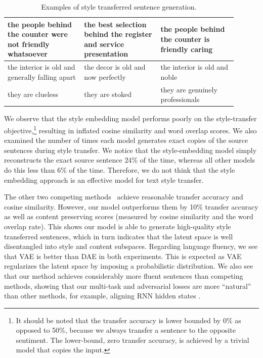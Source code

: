 \documentclass[letterpaper]{article} %
\begin{document}
\begin{table}[!t]
{\begin{tabular}{| p{0.3\linewidth} || p{0.3\linewidth} | p{0.3\linewidth} |}
			the people behind the counter were not friendly whatsoever              & the best selection behind the register and service presentation           & the people behind the counter is friendly caring           \\ \hline
			the interior is old and generally falling apart                         & the decor is old and now perfectly                                        & the interior is old and noble                              \\ \hline
			they are clueless                                                       & they are stoked                                                           & they are genuinely professionals                           \\ \hline
		\end{tabular}}\vspace{-.2cm}
	\caption{Examples of style transferred sentence generation.}\vspace{-.2cm}
	\label{tab:transfer-samples}
\end{table}

We observe that the style embedding model \cite{fu2018style} performs poorly on the style-transfer objective,\footnote{It should be noted that the transfer accuracy is lower bounded by 0\% as opposed to 50\%, because we always transfer a sentence to the opposite sentiment. The lower-bound, zero transfer accuracy, is achieved by a trivial model that copies the input.} resulting in inflated cosine similarity and word overlap scores. We also examined the number of times each model generates exact copies of the source sentences during style transfer. We notice that the style-embedding model simply reconstructs the exact source sentence $24\%$ of the time, whereas all other models do this less than $6\%$ of the time. Therefore, we do not think that the style embedding approach is an effective model for text style transfer.

The other two competing methods~\cite{shen2017style,zhao2018adversarially} achieve reasonable transfer accuracy and cosine similarity. However, our model outperforms them by 10\% transfer accuracy as well as content preserving scores (measured by cosine similarity and the word overlap rate). This shows our model is able to generate high-quality style transferred sentences, which in turn indicates that the  latent space  is well disentangled into style and content subspaces. Regarding language fluency, we see that VAE is better than DAE in both experiments. This is expected as VAE regularizes the latent space by imposing a probabilistic distribution. We also see that our method achieves considerably more fluent sentences than competing methods, showing that our multi-task and adversarial losses are more ``natural'' than other methods, for example, aligning RNN hidden states \cite{shen2017style}.
\end{document}
